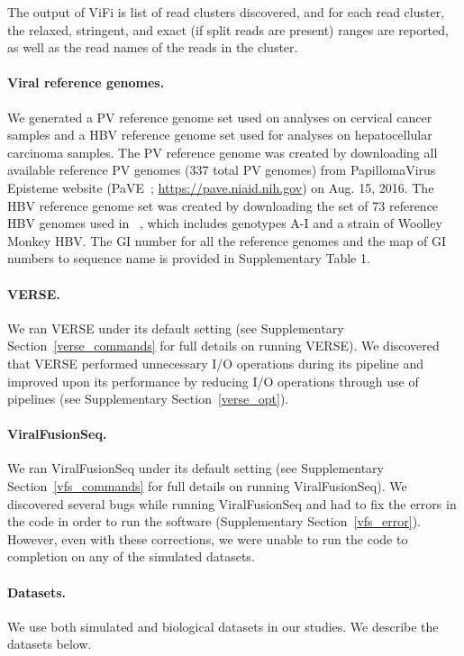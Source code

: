 \documentclass{bmcart}
\begin{document}
The output of ViFi is list of read clusters discovered, and for each read cluster, the relaxed, stringent, and exact (if split reads are present) ranges are reported, as well as the read names of the reads in the cluster.  

\paragraph{\textbf{Viral reference genomes.}}
We generated a PV reference genome set used on analyses on cervical cancer samples and a HBV reference genome set used for analyses on hepatocellular carcinoma samples.  The PV reference genome was created by downloading all available reference PV genomes (337 total PV genomes) from PapillomaVirus Episteme website (PaVE~\cite{VanDoorslaer2017}; \href{https://pave.niaid.nih.gov}{https://pave.niaid.nih.gov}) on Aug. 15, 2016.  The HBV reference genome set was created by downloading the set of 73 reference HBV genomes used in ~\cite{Jiang2012}, which includes genotypes A-I and a strain of Woolley Monkey HBV.  The GI number for all the reference genomes and the map of GI numbers to sequence name is provided in Supplementary Table 1.  

\paragraph{\textbf{VERSE.}}
We ran VERSE under its default setting (see Supplementary Section~\ref{verse_commands} for full details on running VERSE).  We discovered that VERSE performed unnecessary I/O operations during its pipeline and improved upon its performance by reducing I/O operations through use of pipelines (see Supplementary Section~\ref{verse_opt}).

\paragraph{\textbf{ViralFusionSeq.}}
We ran ViralFusionSeq under its default setting (see Supplementary Section~\ref{vfs_commands} for full details on running ViralFusionSeq).  We discovered several bugs while running ViralFusionSeq and had to fix the errors in the code in order to run the software (Supplementary Section~\ref{vfs_error}).  However, even with these corrections, we were unable to run the code to completion on any of the simulated datasets.


\paragraph{\textbf{Datasets.}}  We use both simulated and biological datasets in our studies.  We describe the datasets below.
\end{document}
